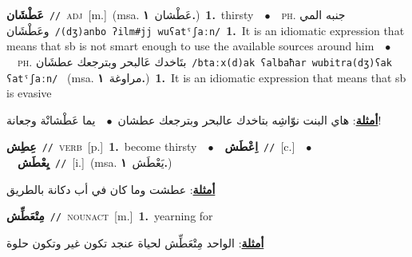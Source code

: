 \documentclass[10pt,a4paper,twoside]{article} %
\begin{document}
\begin{multicols}{2}
{\setlength\topsep{0pt}\textbf{\foreignlanguage{arabic}{عَطْشَان}}\ {\color{gray}\texttt{//}\color{black}}\ \textsc{adj}\ [m.]\ \color{gray}(msa. \foreignlanguage{arabic}{عَطْشان}~\foreignlanguage{arabic}{\textbf{١.}})\color{black}\ \textbf{1.}~thirsty\ \ $\bullet$\ \ \textsc{ph.} \color{gray} \foreignlanguage{arabic}{جنبه المي وعَطْشَان}\color{black}\ {\color{gray}\texttt{/{\sffamily (dʒ)anbo ʔilm\#jj wuʕatˤʃaːn}/}\color{black}}\ \textbf{1.}~It is an idiomatic expression that means that sb is not smart enough to use the available sources around him\ \ $\bullet$\ \ \textsc{ph.} \color{gray} \foreignlanguage{arabic}{بتَاخدك عَالبحر وبترجعك عطشَان}\color{black}\ {\color{gray}\texttt{/{\sffamily btaːx(d)ak ʕalbaħar wubitra(dʒ)ʕak ʕatˤʃaːn}/}\color{black}}\ \color{gray} (msa. \foreignlanguage{arabic}{مراوغة}~\foreignlanguage{arabic}{\textbf{١.}})\color{black}\ \textbf{1.}~It is an idiomatic expression that means that sb is evasive\  \begin{flushright}\color{gray}\foreignlanguage{arabic}{\textbf{\underline{\foreignlanguage{arabic}{أمثلة}}}: هاي البنت نوّاشِه بتاخدك عالبحر وبترجعك عطشان\ $\bullet$\ \  يما عَطْشانْة وجعانة!}\end{flushright}\color{black}} \vspace{2mm}

{\setlength\topsep{0pt}\textbf{\foreignlanguage{arabic}{عِطِش}}\ {\color{gray}\texttt{//}\color{black}}\ \textsc{verb}\ [p.]\ \textbf{1.}~become thirsty\ \ $\bullet$\ \ \setlength\topsep{0pt}\textbf{\foreignlanguage{arabic}{اِعْطَش}}\ {\color{gray}\texttt{//}\color{black}}\ [c.]\ \ $\bullet$\ \ \setlength\topsep{0pt}\textbf{\foreignlanguage{arabic}{يِعْطَش}}\ {\color{gray}\texttt{//}\color{black}}\ [i.]\ \color{gray}(msa. \foreignlanguage{arabic}{يَعْطَش}~\foreignlanguage{arabic}{\textbf{١.}})\color{black}\  \begin{flushright}\color{gray}\foreignlanguage{arabic}{\textbf{\underline{\foreignlanguage{arabic}{أمثلة}}}: عطشت وما كان في أب دكانة بالطريق}\end{flushright}\color{black}} \vspace{2mm}

{\setlength\topsep{0pt}\textbf{\foreignlanguage{arabic}{مِتْعَطِّش}}\ {\color{gray}\texttt{//}\color{black}}\ \textsc{noun\textunderscore act}\ [m.]\ \textbf{1.}~yearning for\  \begin{flushright}\color{gray}\foreignlanguage{arabic}{\textbf{\underline{\foreignlanguage{arabic}{أمثلة}}}: الواحد مِتْعَطِّش لحياة عنجد تكون غير وتكون حلوة}\end{flushright}\color{black}} \vspace{2mm}


\end{multicols}
\end{document}
